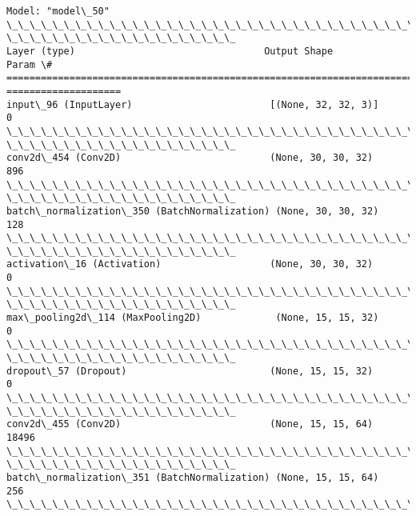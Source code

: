 \documentclass[11pt]{article}
\begin{document}
    \begin{Verbatim}[commandchars=\\\{\}]
Model: "model\_50"
\_\_\_\_\_\_\_\_\_\_\_\_\_\_\_\_\_\_\_\_\_\_\_\_\_\_\_\_\_\_\_\_\_\_\_\_\_\_\_\_\_\_\_\_\_\_\_\_\_\_\_\_\_\_\_\_\_\_\_\_\_\_\_\_\_\_\_\_\_\_\_\_\_\_\_\_\_\_\_\_
\_\_\_\_\_\_\_\_\_\_\_\_\_\_\_\_\_\_\_\_
Layer (type)                                 Output Shape
Param \#
================================================================================
====================
input\_96 (InputLayer)                        [(None, 32, 32, 3)]
0
\_\_\_\_\_\_\_\_\_\_\_\_\_\_\_\_\_\_\_\_\_\_\_\_\_\_\_\_\_\_\_\_\_\_\_\_\_\_\_\_\_\_\_\_\_\_\_\_\_\_\_\_\_\_\_\_\_\_\_\_\_\_\_\_\_\_\_\_\_\_\_\_\_\_\_\_\_\_\_\_
\_\_\_\_\_\_\_\_\_\_\_\_\_\_\_\_\_\_\_\_
conv2d\_454 (Conv2D)                          (None, 30, 30, 32)
896
\_\_\_\_\_\_\_\_\_\_\_\_\_\_\_\_\_\_\_\_\_\_\_\_\_\_\_\_\_\_\_\_\_\_\_\_\_\_\_\_\_\_\_\_\_\_\_\_\_\_\_\_\_\_\_\_\_\_\_\_\_\_\_\_\_\_\_\_\_\_\_\_\_\_\_\_\_\_\_\_
\_\_\_\_\_\_\_\_\_\_\_\_\_\_\_\_\_\_\_\_
batch\_normalization\_350 (BatchNormalization) (None, 30, 30, 32)
128
\_\_\_\_\_\_\_\_\_\_\_\_\_\_\_\_\_\_\_\_\_\_\_\_\_\_\_\_\_\_\_\_\_\_\_\_\_\_\_\_\_\_\_\_\_\_\_\_\_\_\_\_\_\_\_\_\_\_\_\_\_\_\_\_\_\_\_\_\_\_\_\_\_\_\_\_\_\_\_\_
\_\_\_\_\_\_\_\_\_\_\_\_\_\_\_\_\_\_\_\_
activation\_16 (Activation)                   (None, 30, 30, 32)
0
\_\_\_\_\_\_\_\_\_\_\_\_\_\_\_\_\_\_\_\_\_\_\_\_\_\_\_\_\_\_\_\_\_\_\_\_\_\_\_\_\_\_\_\_\_\_\_\_\_\_\_\_\_\_\_\_\_\_\_\_\_\_\_\_\_\_\_\_\_\_\_\_\_\_\_\_\_\_\_\_
\_\_\_\_\_\_\_\_\_\_\_\_\_\_\_\_\_\_\_\_
max\_pooling2d\_114 (MaxPooling2D)             (None, 15, 15, 32)
0
\_\_\_\_\_\_\_\_\_\_\_\_\_\_\_\_\_\_\_\_\_\_\_\_\_\_\_\_\_\_\_\_\_\_\_\_\_\_\_\_\_\_\_\_\_\_\_\_\_\_\_\_\_\_\_\_\_\_\_\_\_\_\_\_\_\_\_\_\_\_\_\_\_\_\_\_\_\_\_\_
\_\_\_\_\_\_\_\_\_\_\_\_\_\_\_\_\_\_\_\_
dropout\_57 (Dropout)                         (None, 15, 15, 32)
0
\_\_\_\_\_\_\_\_\_\_\_\_\_\_\_\_\_\_\_\_\_\_\_\_\_\_\_\_\_\_\_\_\_\_\_\_\_\_\_\_\_\_\_\_\_\_\_\_\_\_\_\_\_\_\_\_\_\_\_\_\_\_\_\_\_\_\_\_\_\_\_\_\_\_\_\_\_\_\_\_
\_\_\_\_\_\_\_\_\_\_\_\_\_\_\_\_\_\_\_\_
conv2d\_455 (Conv2D)                          (None, 15, 15, 64)
18496
\_\_\_\_\_\_\_\_\_\_\_\_\_\_\_\_\_\_\_\_\_\_\_\_\_\_\_\_\_\_\_\_\_\_\_\_\_\_\_\_\_\_\_\_\_\_\_\_\_\_\_\_\_\_\_\_\_\_\_\_\_\_\_\_\_\_\_\_\_\_\_\_\_\_\_\_\_\_\_\_
\_\_\_\_\_\_\_\_\_\_\_\_\_\_\_\_\_\_\_\_
batch\_normalization\_351 (BatchNormalization) (None, 15, 15, 64)
256
\_\_\_\_\_\_\_\_\_\_\_\_\_\_\_\_\_\_\_\_\_\_\_\_\_\_\_\_\_\_\_\_\_\_\_\_\_\_\_\_\_\_\_\_\_\_\_\_\_\_\_\_\_\_\_\_\_\_\_\_\_\_\_\_\_\_\_\_\_\_\_\_\_\_\_\_\_\_\_\_

\end{Verbatim}
\end{document}
